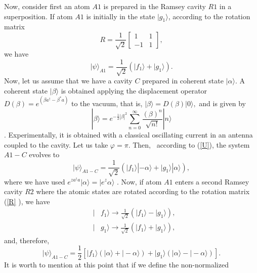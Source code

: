 \documentclass[12pt,thmsa]{article}
\begin{document}
Now, consider first an atom $A1$ is prepared in the Ramsey cavity $R1$ in a
superposition. If atom $A1$ is initially in the state $\mid g_{1}\rangle $,
according to the rotation matrix%
\begin{equation}
R=\frac{1}{\sqrt{2}}\left[ 
\begin{array}{cc}
1 & 1 \\ 
-1 & 1%
\end{array}%
\right] ,  \label{R}
\end{equation}%
we have 
\begin{equation}
\mid \psi \rangle _{A1}=\frac{1}{\sqrt{2}}(\mid f_{1}\rangle +\mid
g_{1}\rangle ).
\end{equation}%
Now, let us assume that we have a cavity $C$ prepared in coherent state $%
|\alpha \rangle $. A coherent state $|\beta \rangle $ is obtained applying
the displacement operator $D(\beta )=e^{(\beta a^{\dag }-\beta ^{\ast }a)}$
to the vacuum, that is, $|\beta \rangle =D(\beta )|0\rangle ,$ and is given
by 
\begin{equation}
|\beta \rangle =e^{-\frac{1}{2}|\beta |^{2}}{\sum\limits_{n=0}^{\infty }}%
\frac{(\beta )^{n}}{\sqrt{n!}}|n\rangle
\end{equation}%
\cite{Louisell, Orszag, WallsMilburn}. Experimentally, it is obtained with a
classical oscillating current in an antenna coupled to the cavity. Let us
take $\varphi =\pi $. Then, \ according to (\ref{U}), the system $A1-C$
evolves to%
\begin{equation}
\mid \psi \rangle _{A1-C}=\frac{1}{\sqrt{2}}(\mid f_{1}\rangle |-\alpha
\rangle +\mid g_{1}\rangle |\alpha \rangle ),
\end{equation}%
where we have used $e^{za^{\dagger }a}|\alpha \rangle =|e^{z}\alpha \rangle $
\cite{Louisell}$.$ Now, if atom $A1$ enters a second Ramsey cavity $R2$
where the atomic states are rotated according to the rotation matrix (\ref{R}%
), we have 
\begin{eqnarray}
&\mid &f_{1}\rangle \rightarrow \frac{1}{\sqrt{2}}(\mid f_{1}\rangle -\mid
g_{1}\rangle ),  \nonumber \\
&\mid &g_{1}\rangle \rightarrow \frac{1}{\sqrt{2}}(\mid f_{1}\rangle +\mid
g_{1}\rangle ),
\end{eqnarray}%
and, therefore,%
\begin{equation}
\mid \psi \rangle _{A1-C}=\frac{1}{2}[\mid f_{1}\rangle (|\alpha \rangle
+|-\alpha \rangle )+\mid g_{1}\rangle (|\alpha \rangle -|-\alpha \rangle )].
\end{equation}%
It is worth to mention at this point that if we define the non-normalized
\end{document}
